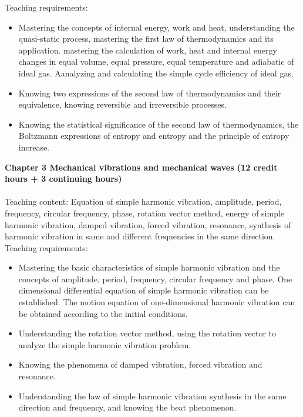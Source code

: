 \documentclass[10pt,a4paper,oneside]{article}
\begin{document}
Teaching requirements:
\begin{itemize}
	\item Mastering the concepts of internal energy, work and heat, understanding the quasi-static process, mastering the first law of thermodynamics and its application. mastering the calculation of work, heat and internal energy changes in equal volume, equal pressure, equal temperature and adiabatic of ideal gas. Aanalyzing and calculating the simple cycle efficiency of ideal gas.
	\item Knowing two expressions of the second law of thermodynamics and their equivalence, knowing reversible and irreversible processes.
	\item  Knowing the statistical significance of the second law of thermodynamics, the Boltzmann expressions of entropy and entropy and the principle of entropy increase.
\end{itemize}
{\bfseries Chapter 3 Mechanical vibrations and mechanical waves (12 credit hours + 3 continuing hours)}\\

\\

Teaching content: Equation of simple harmonic vibration, amplitude, period, frequency, circular frequency, phase, rotation vector method, energy of simple harmonic vibration, damped vibration, forced vibration, resonance, synthesis of harmonic vibration in same and different frequencies in the same direction.\\

Teaching requirements:
\begin{itemize}
	\item Mastering the basic characteristics of simple harmonic vibration and the concepts of amplitude, period, frequency, circular frequency and phase. One dimensional differential equation of simple harmonic vibration can be established. The motion equation of one-dimensional harmonic vibration can be obtained according to the initial conditions.
	\item Understanding the rotation vector method, using the rotation vector to analyze the simple harmonic vibration problem.
	\item Knowing the phenomena of damped vibration, forced vibration and resonance.
	\item Understanding the law of simple harmonic vibration synthesis in the same direction and frequency, and knowing the beat phenomenon.
\end{itemize}
\\
\end{document}
